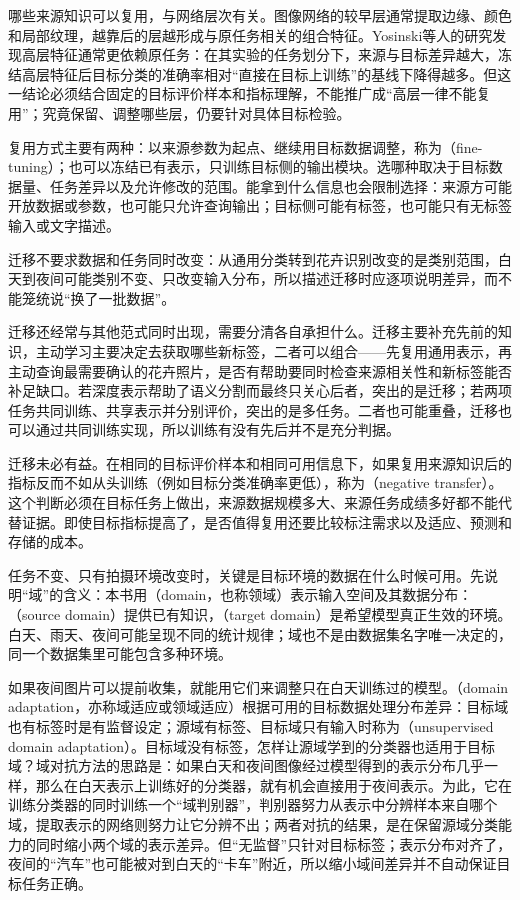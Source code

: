 哪些来源知识可以复用，与网络层次有关。图像网络的较早层通常提取边缘、颜色和局部纹理，越靠后的层越形成与原任务相关的组合特征。Yosinski等人的研究发现高层特征通常更依赖原任务：在其实验的任务划分下，来源与目标差异越大，冻结高层特征后目标分类的准确率相对“直接在目标上训练”的基线下降得越多。但这一结论必须结合固定的目标评价样本和指标理解，不能推广成“高层一律不能复用”；究竟保留、调整哪些层，仍要针对具体目标检验。

复用方式主要有两种：以来源参数为起点、继续用目标数据调整，称为（fine-tuning）；也可以冻结已有表示，只训练目标侧的输出模块。选哪种取决于目标数据量、任务差异以及允许修改的范围。能拿到什么信息也会限制选择：来源方可能开放数据或参数，也可能只允许查询输出；目标侧可能有标签，也可能只有无标签输入或文字描述。

迁移不要求数据和任务同时改变：从通用分类转到花卉识别改变的是类别范围，白天到夜间可能类别不变、只改变输入分布，所以描述迁移时应逐项说明差异，而不能笼统说“换了一批数据”。

迁移还经常与其他范式同时出现，需要分清各自承担什么。迁移主要补充先前的知识，主动学习主要决定去获取哪些新标签，二者可以组合——先复用通用表示，再主动查询最需要确认的花卉照片，是否有帮助要同时检查来源相关性和新标签能否补足缺口。若深度表示帮助了语义分割而最终只关心后者，突出的是迁移；若两项任务共同训练、共享表示并分别评价，突出的是多任务。二者也可能重叠，迁移也可以通过共同训练实现，所以训练有没有先后并不是充分判据。

迁移未必有益。在相同的目标评价样本和相同可用信息下，如果复用来源知识后的指标反而不如从头训练（例如目标分类准确率更低），称为（negative transfer）。这个判断必须在目标任务上做出，来源数据规模多大、来源任务成绩多好都不能代替证据。即使目标指标提高了，是否值得复用还要比较标注需求以及适应、预测和存储的成本。

任务不变、只有拍摄环境改变时，关键是目标环境的数据在什么时候可用。先说明“域”的含义：本书用（domain，也称领域）表示输入空间及其数据分布：（source domain）提供已有知识，（target domain）是希望模型真正生效的环境。白天、雨天、夜间可能呈现不同的统计规律；域也不是由数据集名字唯一决定的，同一个数据集里可能包含多种环境。

如果夜间图片可以提前收集，就能用它们来调整只在白天训练过的模型。（domain adaptation，亦称域适应或领域适应）根据可用的目标数据处理分布差异：目标域也有标签时是有监督设定；源域有标签、目标域只有输入时称为（unsupervised domain adaptation）。目标域没有标签，怎样让源域学到的分类器也适用于目标域？域对抗方法的思路是：如果白天和夜间图像经过模型得到的表示分布几乎一样，那么在白天表示上训练好的分类器，就有机会直接用于夜间表示。为此，它在训练分类器的同时训练一个“域判别器”，判别器努力从表示中分辨样本来自哪个域，提取表示的网络则努力让它分辨不出；两者对抗的结果，是在保留源域分类能力的同时缩小两个域的表示差异。但“无监督”只针对目标标签；表示分布对齐了，夜间的“汽车”也可能被对到白天的“卡车”附近，所以缩小域间差异并不自动保证目标任务正确。

